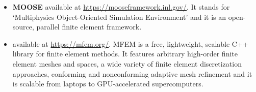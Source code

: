 \begin{itemize}
\item {\bf MOOSE} available at \url{https://mooseframework.inl.gov/}.
It stands for `Multiphysics Object-Oriented Simulation Environment' and it is an 
open-source, parallel finite element framework.

\item {} available at \url{https://mfem.org/}.
MFEM is a free, lightweight, scalable C++ library for finite element methods.
It features arbitrary high-order finite element meshes and spaces,
a wide variety of finite element discretization approaches, 
conforming and nonconforming adaptive mesh refinement and it is 
scalable from laptops to GPU-accelerated supercomputers.


\end{itemize}



